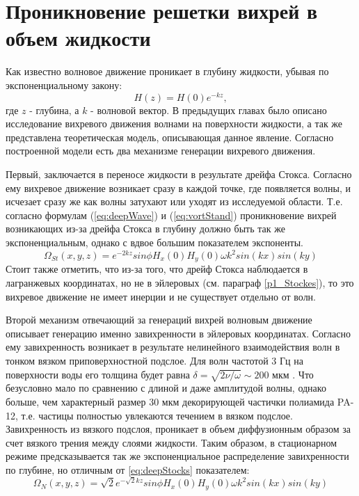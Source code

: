 \chapter{Проникновение решетки вихрей в объем жидкости} \label{chapt6}

Как известно \cite{land} волновое движение проникает в глубину жидкости, убывая по экспоненциальному закону:
\begin{equation}
 \label{eq:deepWave}
H(z) = H(0) e^{-kz},
\end{equation}
 где $z$ - глубина, а $k$ - волновой вектор. 
 В предыдущих главах было описано исследование вихревого движения волнами на поверхности жидкости, а так же представлена теоретическая модель, описывающая данное явление.
Согласно построенной модели есть два механизме генерации вихревого движения. 

	Первый, заключается в переносе жидкости в результате дрейфа Стокса. Согласно ему вихревое движение возникает сразу в каждой точке, где появляется волны, и исчезает сразу же как волны затухают или уходят из исследуемой области. Т.е. согласно формулам  (\ref{eq:deepWave}) и (\ref{eq:vortStand}) проникновение вихрей возникающих из-за дрейфа Стокса в глубину должно быть так же экспоненциальным, однако с вдвое большим показателем экспоненты.
\begin{equation}
 \label{eq:deepStocks}
\Omega_{St}(x,y,z) = e^{-2kz} sin \phi H_x(0) H_y(0) \omega k^2 sin(kx)sin(ky)
\end{equation}
Стоит также отметить, что из-за того, что дрейф Стокса наблюдается в лагранжевых координатах, но не в эйлеровых (см. параграф \ref{p1_Stockes}), то это вихревое движение не имеет инерции и не существует отдельно от волн.

	Второй механизм отвечающий за генераций вихрей волновым движение описывает генерацию именно завихренности в эйлеровых координатах. Согласно ему завихренность возникает в результате нелинейного взаимодействия волн в тонком вязком приповерхностной подслое. Для волн частотой 3 Гц на поверхности воды его толщина будет равна $\delta = \sqrt{2 \nu / \omega} \sim 200 $ мкм \cite{FalkovichBook}. Что безусловно мало по сравнению с длиной и даже амплитудой волны, однако больше, чем характерный размер 30 мкм декорирующей частички полиамида PA-12, т.е. частицы полностью увлекаются течением в вязком подслое. Завихренность из вязкого подслоя, проникает в объем диффузионным образом за счет вязкого трения между слоями жидкости. Таким образом, в стационарном режиме предсказывается так же экспоненциальное распределение завихренности по глубине, но отличным от \ref{eq:deepStocks} показателем:
\begin{equation}
 \label{eq:deepEyler}
\Omega_N(x,y,z) = \sqrt{2}e^{-\sqrt{2}kz} sin \phi H_x(0) H_y(0) \omega k^2 sin(kx)sin(ky)
\end{equation}

